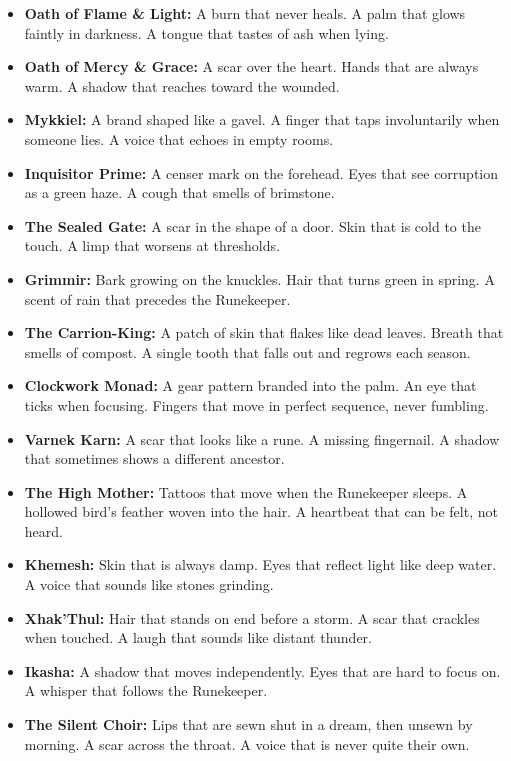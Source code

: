 \begin{itemize}
\item \textbf{Oath of Flame \& Light:} A burn that never heals. A palm that glows faintly in darkness. A tongue that tastes of ash when lying.
\item \textbf{Oath of Mercy \& Grace:} A scar over the heart. Hands that are always warm. A shadow that reaches toward the wounded.
\item \textbf{Mykkiel:} A brand shaped like a gavel. A finger that taps involuntarily when someone lies. A voice that echoes in empty rooms.
\item \textbf{Inquisitor Prime:} A censer mark on the forehead. Eyes that see corruption as a green haze. A cough that smells of brimstone.
\item \textbf{The Sealed Gate:} A scar in the shape of a door. Skin that is cold to the touch. A limp that worsens at thresholds.
\item \textbf{Grimmir:} Bark growing on the knuckles. Hair that turns green in spring. A scent of rain that precedes the Runekeeper.
\item \textbf{The Carrion-King:} A patch of skin that flakes like dead leaves. Breath that smells of compost. A single tooth that falls out and regrows each season.
\item \textbf{Clockwork Monad:} A gear pattern branded into the palm. An eye that ticks when focusing. Fingers that move in perfect sequence, never fumbling.
\item \textbf{Varnek Karn:} A scar that looks like a rune. A missing fingernail. A shadow that sometimes shows a different ancestor.
\item \textbf{The High Mother:} Tattoos that move when the Runekeeper sleeps. A hollowed bird's feather woven into the hair. A heartbeat that can be felt, not heard.
\item \textbf{Khemesh:} Skin that is always damp. Eyes that reflect light like deep water. A voice that sounds like stones grinding.
\item \textbf{Xhak'Thul:} Hair that stands on end before a storm. A scar that crackles when touched. A laugh that sounds like distant thunder.
\item \textbf{Ikasha:} A shadow that moves independently. Eyes that are hard to focus on. A whisper that follows the Runekeeper.
\item \textbf{The Silent Choir:} Lips that are sewn shut in a dream, then unsewn by morning. A scar across the throat. A voice that is never quite their own.

\end{itemize}
